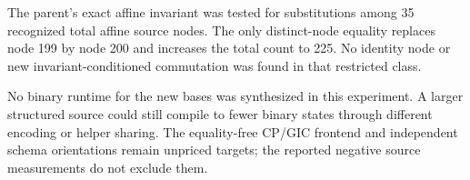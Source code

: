 The parent's exact affine invariant was tested for substitutions among 35
recognized total affine source nodes.  The only distinct-node equality replaces
node 199 by node 200 and increases the total count to 225.  No identity node or
new invariant-conditioned commutation was found in that restricted class.

No binary runtime for the new bases was synthesized in this experiment.  A
larger structured source could still compile to fewer binary states through
different encoding or helper sharing.  The equality-free CP/GIC frontend and
independent schema orientations remain unpriced targets; the reported negative
source measurements do not exclude them.
